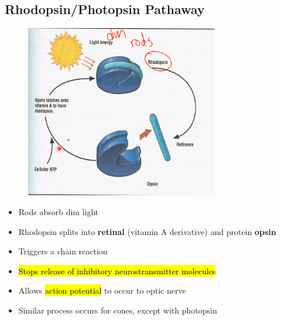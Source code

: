 \documentclass[a4paper,12pt]{article}
\begin{document}
\subsection{Rhodopsin/Photopsin Pathaway}
\begin{figure}[H]
    \centering
    \includegraphics[width=0.75\textwidth]{rhodopsin}
\end{figure}
\begin{itemize}
    \item{Rods absorb dim light}
    \item{Rhodopsin splits into \textbf{retinal} (vitamin A derivative) and protein \textbf{opsin}}
    \item{Triggers a chain reaction}
    \item{\hl{Stops release of inhibitory neurostransmitter molecules}}
    \item{Allows \hl{action potential} to occur to optic nerve}
    \item{Similar process occurs for cones, except with photopsin}
\end{itemize}
\end{document}
